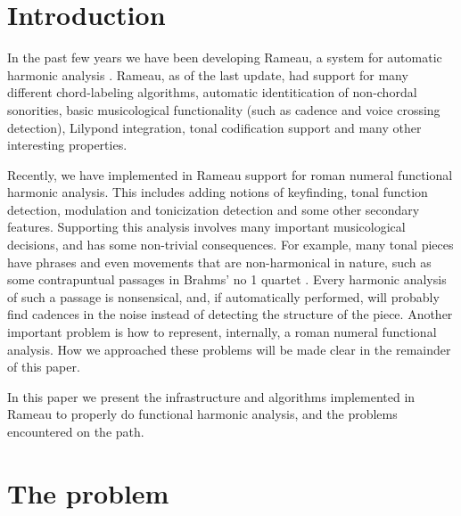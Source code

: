 
\section{Introduction}
\label{sec:introduction}


In the past few years we have been developing Rameau, a system for
automatic harmonic analysis \cite{kroger08:rameau}. Rameau, as of the
last update, had support for many different chord-labeling algorithms,
automatic identitication of non-chordal sonorities, basic
musicological functionality (such as cadence and voice crossing
detection), Lilypond \cite{nienhuys.ea08:lilypond} integration, tonal
codification support and many other interesting properties.


Recently, we have implemented in Rameau support for roman numeral
functional harmonic analysis. This includes adding notions of
keyfinding, tonal function detection, modulation and tonicization
detection and some other secondary features. Supporting this analysis
involves many important musicological decisions, and has some
non-trivial consequences. For example, many tonal pieces have phrases
and even movements that are non-harmonical in nature, such as some
contrapuntual passages in Brahms' no 1 quartet . Every harmonic analysis of such a passage is nonsensical,
and, if automatically performed, will probably find cadences in the
noise instead of detecting the structure of the piece. Another
important problem is how to represent, internally, a roman numeral
functional analysis. How we approached these problems will be made
clear in the remainder of this paper.


\cite{raphael.ea03:harmonic} \cite{maxwell92:expert}
\cite{tsui02:harmonic} \cite{temperley.ea99:modeling}
\cite{taube99:automatic} \cite{winograd68:linguistics}
\cite{barthelemy.ea01:figured} \cite{ulrich77:analysis}


In this paper we present the infrastructure and algorithms implemented
in Rameau to properly do functional harmonic analysis, and the
problems encountered on the path.


\section{The problem}
\label{sec:problem}

